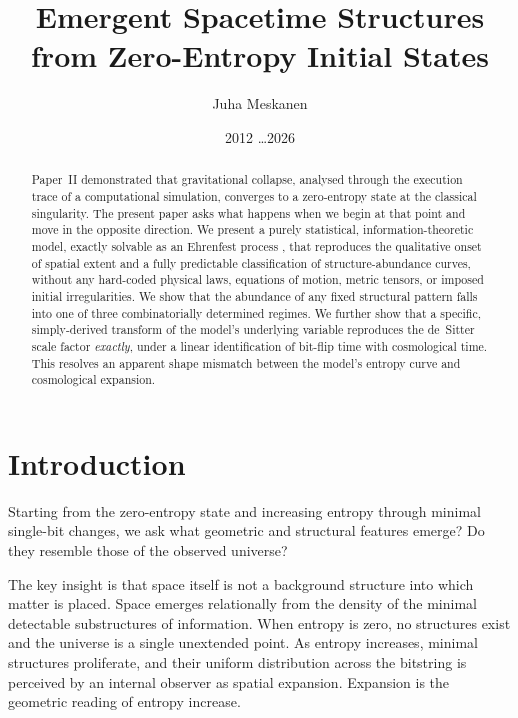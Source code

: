 \documentclass[11pt]{article}
\title{Emergent Spacetime Structures from Zero-Entropy Initial States}
\author{Juha Meskanen}
\date{2012 \dots 2026}
\begin{document}
\maketitle

\begin{abstract}
  Paper~II \cite{meskanen2002} demonstrated that gravitational collapse, analysed through the execution trace of a computational simulation,
  converges to a zero-entropy state at the classical singularity.
  The present paper asks what happens when we begin at that point and move in the opposite direction.
  We present a purely statistical, information-theoretic model, exactly solvable as an Ehrenfest process
  \cite{ehrenfest1907}, that reproduces the qualitative onset of spatial extent and a fully predictable
  classification of structure-abundance curves, without any hard-coded physical laws, equations of motion,
  metric tensors, or imposed initial irregularities. We show that the abundance of any fixed structural
  pattern falls into one of three combinatorially determined regimes. We further show that a specific,
  simply-derived transform of the model's underlying variable reproduces the de~Sitter scale factor
  \emph{exactly}, under a linear identification of bit-flip time with cosmological time. This resolves an
  apparent shape mismatch between the model's entropy curve and cosmological expansion. 
\end{abstract}

\section{Introduction}
\label{sec:intro}

Starting from the zero-entropy state and increasing entropy through minimal single-bit changes,
we ask what geometric and structural features emerge? Do they resemble those of the observed universe?

The key insight is that space itself is not a background structure into which matter is placed.
Space emerges relationally from the density of the minimal detectable substructures of information.
When entropy is zero, no structures exist and the universe is a single unextended point.
As entropy increases, minimal structures proliferate, and their uniform distribution across the bitstring is
perceived by an internal observer as spatial expansion.
Expansion is the geometric reading of entropy increase.
\end{document}
